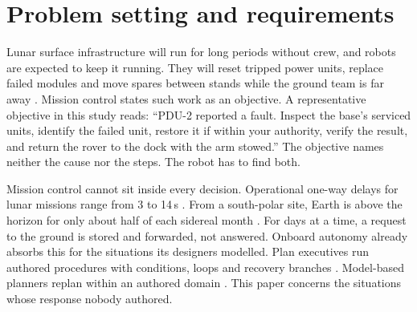 \providecommand{\TBD}[1]{\textcolor{red}{[TBD: #1]}}

\section{Problem setting and requirements}
\label{sec:requirements}

Lunar surface infrastructure will run for long periods without crew, and robots are expected to keep it running. They
will reset tripped power units, replace failed modules and move spares between stands while the ground team is far
away \citep{lewis2022uncrewed}. Mission control states such work as an objective. A representative objective in this
study reads: ``PDU-2 reported a fault. Inspect the base's serviced units, identify the failed unit, restore it if within
your authority, verify the result, and return the rover to the dock with the arm stowed.'' The objective names neither
the cause nor the steps. The robot has to find both.

Mission control cannot sit inside every decision. Operational one-way delays for lunar missions range from 3 to 14\,s
\citep{landon2025delay}. From a south-polar site, Earth is above the horizon for only about half of each sidereal month
\citep{nasa2023lcn}. For days at a time, a request to the ground is stored and forwarded, not answered. Onboard autonomy
already absorbs this for the situations its designers modelled. Plan executives run authored procedures with conditions,
loops and recovery branches \citep{estlin2006plexil}. Model-based planners replan within an authored domain
\citep{bedraxweiss2004europa,rabideau2025cadre}. This paper concerns the situations whose response nobody authored.

